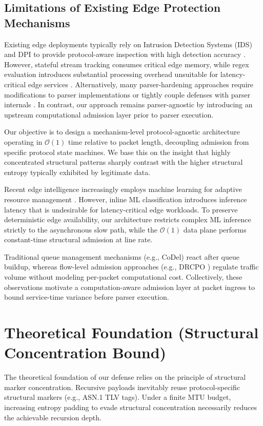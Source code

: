 \documentclass[conference]{IEEEtran}
\begin{document}
\subsection{Limitations of Existing Edge Protection Mechanisms}
Existing edge deployments typically rely on Intrusion Detection Systems (IDS) and DPI to provide protocol-aware inspection with high detection accuracy \cite{Zhang_Edge_2018}. However, stateful stream tracking consumes critical edge memory, while regex evaluation introduces substantial processing overhead unsuitable for latency-critical edge services \cite{SmartNIC_2019, Sadiq_DataPlane_2023}. Alternatively, many parser-hardening approaches require modifications to parser implementations or tightly couple defenses with parser internals \cite{Wang2024}. In contrast, our approach remains parser-agnostic by introducing an upstream computational admission layer prior to parser execution.

Our objective is to design a mechanism-level protocol-agnostic architecture operating in $\mathcal{O}(1)$ time relative to packet length, decoupling admission from specific protocol state machines. We base this on the insight that highly concentrated structural patterns sharply contrast with the higher structural entropy typically exhibited by legitimate data.

Recent edge intelligence increasingly employs machine learning for adaptive resource management \cite{SACD_2025}. However, inline ML classification introduces inference latency that is undesirable for latency-critical edge workloads. To preserve deterministic edge availability, our architecture restricts complex ML inference strictly to the asynchronous slow path, while the $\mathcal{O}(1)$ data plane performs constant-time structural admission at line rate.

Traditional queue management mechanisms (e.g., CoDel) react after queue buildup, whereas flow-level admission approaches (e.g., DRCPO \cite{10778339}) regulate traffic volume without modeling per-packet computational cost. Collectively, these observations motivate a computation-aware admission layer at packet ingress to bound service-time variance before parser execution.

\section{Theoretical Foundation (Structural Concentration Bound)}

The theoretical foundation of our defense relies on the principle of structural marker concentration. Recursive payloads inevitably reuse protocol-specific structural markers (e.g., ASN.1 TLV tags). Under a finite MTU budget, increasing entropy padding to evade structural concentration necessarily reduces the achievable recursion depth.
\end{document}
